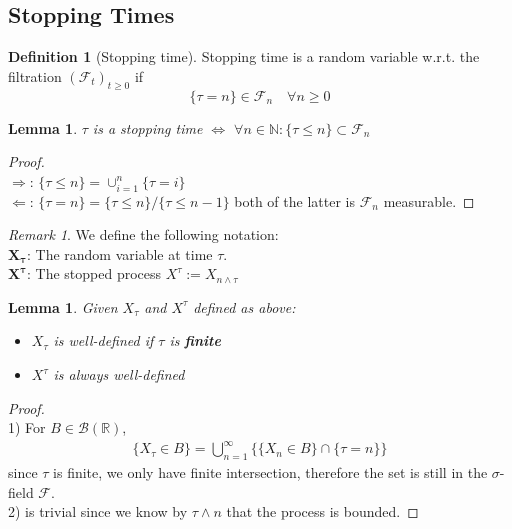 \documentclass[a4paper,11pt]{book}
\newtheorem{lemma}[theorem]{Lemma}
\theoremstyle{definition}
\newtheorem{definition}{Definition}[section]
\theoremstyle{remark}
\newtheorem*{remark}{Remark}
\begin{document}
\subsection{Stopping Times}
\begin{definition}[Stopping time]
Stopping time is a random variable w.r.t. the filtration $(\mathcal{F}_t)_{t \ge 0}$ if 
	\begin{equation*}
		\{\tau = n \} \in \mathcal{F}_n \quad \forall n \geq 0
	\end{equation*}
\end{definition}

\begin{lemma}
	$\tau$ is a stopping time $\Leftrightarrow$ $ \forall n \in \mathbb{N}: \{\tau \leq n \} \subset \mathcal{F}_n$
\end{lemma}
\begin{proof}\quad\\
	$\Rightarrow$: $\{ \tau \leq n\} = \cup_{i = 1}^n \{\tau = i \}$\\
	$\Leftarrow$: $\{\tau = n\} = \{ \tau \leq n \} \slash \{ \tau \leq n-1 \}$ both of the latter is $\mathcal{F}_n$ measurable.
\end{proof}

\begin{remark}
We define the following notation:\\
$\mathbf{X_\tau}$: The random variable at time $\tau$.\\
$\mathbf{X^\tau}$: The stopped process $X^\tau:= X_{n \wedge \tau}$
\end{remark}

\begin{lemma}
	Given $X_\tau$ and $X^\tau$ defined as above:
	\begin{itemize}
		\item $X_\tau$ is well-defined if $\tau$ is \textbf{finite}
		\item $X^\tau$ is always well-defined
	\end{itemize}
\end{lemma}
\begin{proof}\quad\\
	1) For $B \in \mathcal{B}(\mathbb{R})$, 
	\begin{align*}
		\{X_\tau \in B \} = \bigcup_{n = 1}^\infty\bigg\{ \{X_n \in B\} \cap \{\tau = n\} \bigg\}
	\end{align*}
	since $\tau$ is finite, we only have finite intersection, therefore the set is still in the $\sigma$-field $\mathcal{F}$.\\
	2) is trivial since we know by $\tau \wedge n$ that the process is bounded.
\end{proof}
\end{document}
